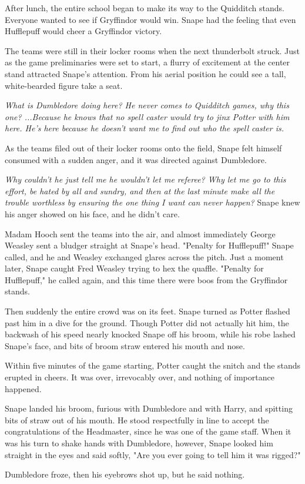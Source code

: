 After lunch, the entire school began to make its way to the Quidditch stands. Everyone wanted to see if Gryffindor would win. Snape had the feeling that even Hufflepuff would cheer a Gryffindor victory.

The teams were still in their locker rooms when the next thunderbolt struck. Just as the game preliminaries were set to start, a flurry of excitement at the center stand attracted Snape's attention. From his aerial position he could see a tall, white-bearded figure take a seat.

\emph{What is Dumbledore doing here? He never comes to Quidditch games, why this one? ...Because he knows that no spell caster would try to jinx Potter with him here. He's here because he doesn't want me to find out who the spell caster is.}

As the teams filed out of their locker rooms onto the field, Snape felt himself consumed with a sudden anger, and it was directed against Dumbledore.

\emph{Why couldn't he just tell me he wouldn't let me referee? Why let me go to this effort, be hated by all and sundry, and then at the last minute make all the trouble worthless by ensuring the one thing I want can never happen?} Snape knew his anger showed on his face, and he didn't care.

Madam Hooch sent the teams into the air, and almost immediately George Weasley sent a bludger straight at Snape's head. "Penalty for Hufflepuff!" Snape called, and he and Weasley exchanged glares across the pitch. Just a moment later, Snape caught Fred Weasley trying to hex the quaffle. "Penalty for Hufflepuff," he called again, and this time there were boos from the Gryffindor stands.

Then suddenly the entire crowd was on its feet. Snape turned as Potter flashed past him in a dive for the ground. Though Potter did not actually hit him, the backwash of his speed nearly knocked Snape off his broom, while his robe lashed Snape's face, and bits of broom straw entered his mouth and nose.

Within five minutes of the game starting, Potter caught the snitch and the stands erupted in cheers. It was over, irrevocably over, and nothing of importance happened.

Snape landed his broom, furious with Dumbledore and with Harry, and spitting bits of straw out of his mouth. He stood respectfully in line to accept the congratulations of the Headmaster, since he was one of the game staff. When it was his turn to shake hands with Dumbledore, however, Snape looked him straight in the eyes and said softly, "Are you ever going to tell him it was rigged?"

Dumbledore froze, then his eyebrows shot up, but he said nothing. 


